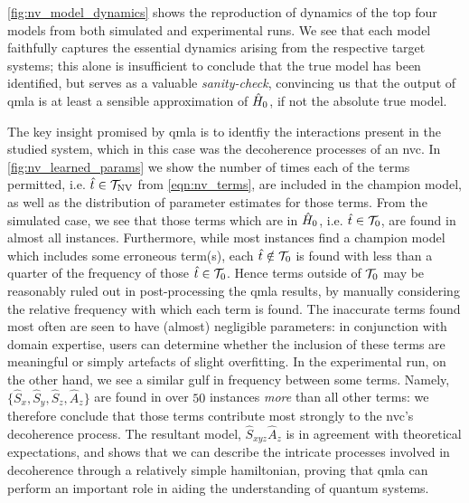 \cref{fig:nv_model_dynamics} shows the reproduction of dynamics of the top four models
    from both simulated and experimental \glspl{run}. 
We see that each model faithfully captures the essential dynamics arising from the respective target systems;
    this alone is insufficient to conclude that the \gls{true model} has been identified, 
    but serves as a valuable \emph{sanity-check}, convincing us that the output of \gls{qmla} is at least a sensible 
    approximation of $\hat{H}_0$, if not the absolute \gls{true model}.
\par 

The key insight promised by \gls{qmla} is to identfiy the interactions present in the studied system, 
    which in this case was the decoherence processes of an \gls{nvc}.
In \cref{fig:nv_learned_params} we show the number of times each of the terms permitted, 
    i.e. $\hat{t} \in \mathcal{T}_{\textrm{NV}}$ from \cref{eqn:nv_terms},
    are included in the \gls{champion model},
    as well as the distribution of parameter estimates for those terms. 
From the simulated case, we see that those terms which are in $\hat{H}_0$, i.e. $\hat{t} \in \mathcal{T}_0$, are found in almost all instances.
Furthermore, while most instances find a \gls{champion model} which includes some erroneous term(s), 
    each $\hat{t} \notin \mathcal{T}_0$ is found with less than a quarter of the frequency of those $\hat{t} \in \mathcal{T}_0$.
Hence terms outside of $\mathcal{T}_0$ may be reasonably ruled out in post-processing the \gls{qmla} results, 
    by manually considering the relative frequency with which each term is found. 
The inaccurate terms found most often are seen to have (almost) negligible parameters:
    in conjunction with domain expertise, users can determine whether the inclusion of these terms 
    are meaningful or simply artefacts of slight overfitting.
In the experimental \gls{run}, on the other hand, we see a similar gulf in frequency between some terms.
Namely, $\{ \hat{S}_x, \hat{S}_y, \hat{S}_z, \hat{A}_z \}$ are found in over $50$ \glspl{instance} \emph{more} than all other terms:
    we therefore conclude that those terms contribute most strongly to the \gls{nvc}'s decoherence process.
The resultant model, $\hat{S}_{xyz}\hat{A}_{z}$ is in agreement with theoretical expectations, 
    and shows that we can describe the intricate processes involved in decoherence through a relatively simple 
    \gls{hamiltonian}, proving that \gls{qmla} can perform an important role in aiding the understanding of quantum systems.  
\par 


